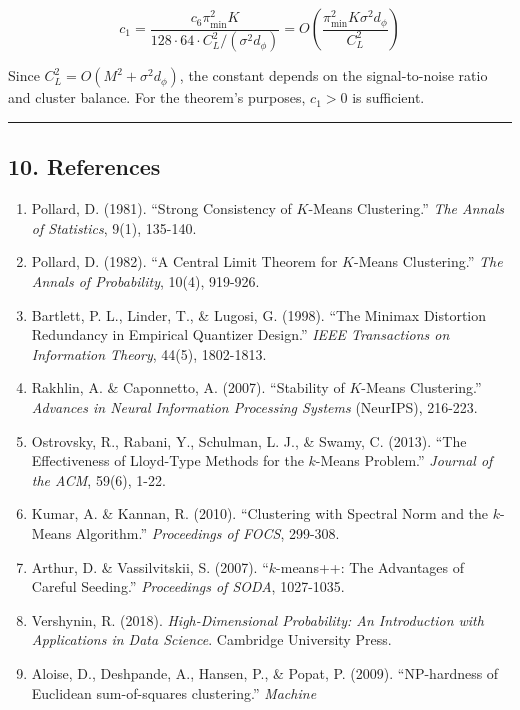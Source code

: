 \documentclass[
  12pt,
]{ctexart}
\begin{document}
\[c_1 = \frac{c_6 \pi_{\min}^2 K}{128 \cdot 64 \cdot C_L^2 / (\sigma^2 d_\phi)} = O\left(\frac{\pi_{\min}^2 K \sigma^2 d_\phi}{C_L^2}\right)\]

Since \(C_L^2 = O(M^2 + \sigma^2 d_\phi)\), the constant depends on the
signal-to-noise ratio and cluster balance. For the theorem's purposes,
\(c_1 > 0\) is sufficient.

\begin{center}\rule{0.5\linewidth}{0.5pt}\end{center}

\subsection{10. References}\label{references}

\begin{enumerate}
\def\labelenumi{\arabic{enumi}.}
\item
  Pollard, D. (1981). ``Strong Consistency of \(K\)-Means Clustering.''
  \emph{The Annals of Statistics}, 9(1), 135-140.
\item
  Pollard, D. (1982). ``A Central Limit Theorem for \(K\)-Means
  Clustering.'' \emph{The Annals of Probability}, 10(4), 919-926.
\item
  Bartlett, P. L., Linder, T., \& Lugosi, G. (1998). ``The Minimax
  Distortion Redundancy in Empirical Quantizer Design.'' \emph{IEEE
  Transactions on Information Theory}, 44(5), 1802-1813.
\item
  Rakhlin, A. \& Caponnetto, A. (2007). ``Stability of \(K\)-Means
  Clustering.'' \emph{Advances in Neural Information Processing Systems}
  (NeurIPS), 216-223.
\item
  Ostrovsky, R., Rabani, Y., Schulman, L. J., \& Swamy, C. (2013). ``The
  Effectiveness of Lloyd-Type Methods for the \(k\)-Means Problem.''
  \emph{Journal of the ACM}, 59(6), 1-22.
\item
  Kumar, A. \& Kannan, R. (2010). ``Clustering with Spectral Norm and
  the \(k\)-Means Algorithm.'' \emph{Proceedings of FOCS}, 299-308.
\item
  Arthur, D. \& Vassilvitskii, S. (2007). ``\(k\)-means++: The
  Advantages of Careful Seeding.'' \emph{Proceedings of SODA},
  1027-1035.
\item
  Vershynin, R. (2018). \emph{High-Dimensional Probability: An
  Introduction with Applications in Data Science}. Cambridge University
  Press.
\item
  Aloise, D., Deshpande, A., Hansen, P., \& Popat, P. (2009).
  ``NP-hardness of Euclidean sum-of-squares clustering.'' \emph{Machine
}
\end{enumerate}
\end{document}
